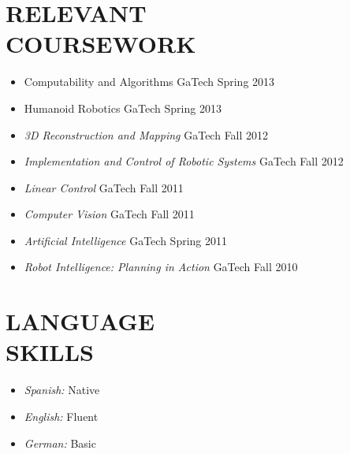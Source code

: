 \documentclass[margin]{res}
\begin{document}
\begin{resume}
\section{RELEVANT \\ COURSEWORK} 
                 \begin{itemize}  \itemsep -2pt %
	             \item{Computability and Algorithms} \hfill GaTech Spring 2013 
	             \item{Humanoid Robotics} \hfill GaTech Spring 2013 	             
                 \item{\sl 3D Reconstruction and Mapping} \hfill GaTech Fall 2012 
                 \item{\sl Implementation and Control of Robotic Systems} \hfill GaTech Fall 2012 
                 \item{\sl Linear Control} \hfill GaTech Fall 2011                  
                 \item{\sl Computer Vision} \hfill GaTech Fall 2011  
                 \item{\sl Artificial Intelligence} \hfill GaTech Spring 2011                                                    
                 \item{\sl Robot Intelligence: Planning in Action} \hfill GaTech Fall 2010                  
                 \end{itemize}

\section{LANGUAGE \\ SKILLS} 
                 \begin{itemize}  \itemsep -2pt %
                 \item{{\sl Spanish:}} Native 
                 \item{\sl English:} Fluent
                 \item{\sl German:} Basic 
                 \end{itemize}




\end{resume}
\end{document}
